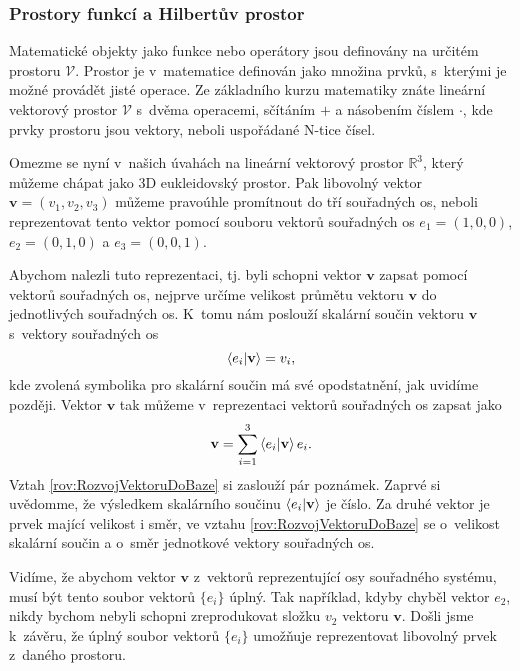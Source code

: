 \subsubsection{Prostory funkcí a Hilbertův prostor}
\label{kap:ProstoryFunkci}

Matematické objekty jako funkce nebo operátory jsou definovány na určitém prostoru $\mathcal{V}$. Prostor je v~matematice definován jako množina prvků, s~kterými je možné provádět jisté operace. Ze základního kurzu matematiky znáte lineární vektorový prostor $\mathcal{V}$ s~dvěma operacemi, sčítáním $+$ a násobením číslem $\cdot$, kde prvky prostoru jsou vektory, neboli uspořádané N-tice čísel.

Omezme se nyní v~našich úvahách na lineární vektorový prostor $\mathbb{R}^3$, který můžeme chápat jako 3D eukleidovský prostor. Pak libovolný vektor $\mathbf{v} = (v_1, v_2, v_3)$ můžeme pravoúhle promítnout do tří souřadných os, neboli reprezentovat tento vektor pomocí souboru vektorů souřadných os $e_1 = (1, 0, 0)$, $e_2 = (0, 1, 0)$ a $e_3 = (0, 0, 1)$.

Abychom nalezli tuto reprezentaci, tj. byli schopni vektor $\mathbf{v}$ zapsat pomocí vektorů souřadných os, nejprve určíme velikost průmětu vektoru $\mathbf{v}$ do jednotlivých souřadných os. K~tomu nám poslouží skalární součin vektoru $\mathbf{v}$ s~vektory souřadných os
\begin{equation}
\braket{e_i|\mathbf{v}} = v_i,
\nonumber
\end{equation}
kde zvolená symbolika pro skalární součin má své opodstatnění, jak uvidíme později. Vektor $\mathbf{v}$ tak můžeme v~reprezentaci vektorů souřadných os zapsat jako
\begin{equation}
\mathbf{v} = \sum_{i=1}^{3} \braket{e_i|\mathbf{v}} e_i.
\label{rov:RozvojVektoruDoBaze}
\end{equation}
Vztah \eqref{rov:RozvojVektoruDoBaze} si zaslouží pár poznámek. Zaprvé si uvědomme, že výsledkem skalárního součinu $\braket{e_i|\mathbf{v}}$ je číslo. Za druhé vektor je prvek mající velikost i směr, ve vztahu \eqref{rov:RozvojVektoruDoBaze} se o~velikost  skalární součin a o~směr jednotkové vektory souřadných os.

Vidíme, že abychom vektor $\mathbf{v}$  z~vektorů reprezentující osy souřadného systému, musí být tento soubor vektorů $\{e_i\}$ úplný. Tak například, kdyby chyběl vektor $e_2$, nikdy bychom nebyli schopni zreprodukovat složku $v_2$ vektoru $\mathbf{v}$. Došli jsme k~závěru, že úplný soubor vektorů $\{e_i\}$ umožňuje reprezentovat libovolný prvek z~daného prostoru.

